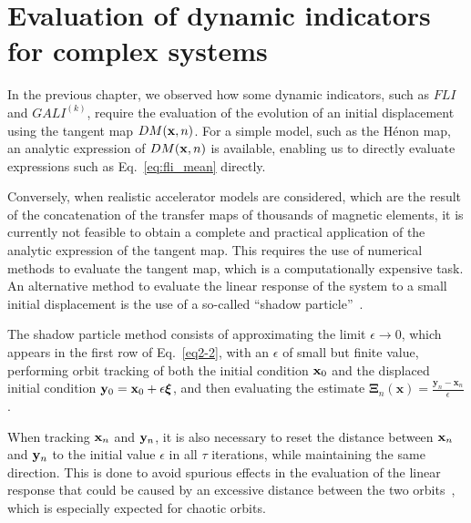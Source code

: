 \section{Evaluation of dynamic indicators for complex systems}\label{sec:8:evaluation}

In the previous chapter, we observed how some dynamic indicators, such as $FLI$ and $GALI^{(k)}$, require the evaluation of the evolution of an initial displacement using the tangent map $DM(\vb{x}, n)$. For a simple model, such as the Hénon map, an analytic expression of $DM(\vb{x}, n)$ is available, enabling us to directly evaluate expressions such as Eq.~\ref{eq:fli_mean} directly.

Conversely, when realistic accelerator models are considered, which are the result of the concatenation of the transfer maps of thousands of magnetic elements, it is currently not feasible to obtain a complete and practical application of the analytic expression of the tangent map. This requires the use of numerical methods to evaluate the tangent map, which is a computationally expensive task. An alternative method to evaluate the linear response of the system to a small initial displacement is the use of a so-called ``shadow particle''~\cite{Skokos2010b}.

The shadow particle method consists of approximating the limit $\epsilon\to 0$, which appears in the first row of Eq.~\eqref{eq2-2}, with an $\epsilon$ of small but finite value, performing orbit tracking of both the initial condition $\vb{x}_0$ and the displaced initial condition $\vb{y}_0 = \vb{x}_0 + \epsilon \boldsymbol{\xi}$, and then evaluating the estimate $\boldsymbol{\Xi}_{n}(\mathbf{x})=\frac{\mathbf{y}_{n}-\mathbf{x}_{n}}{\epsilon}$.

When tracking $\vb{x}_n$ and $\vb{y}_n$, it is also necessary to reset the distance between $\vb{x}_n$ and $\vb{y}_n$ to the initial value $\epsilon$ in all $\tau$ iterations, while maintaining the same direction. This is done to avoid spurious effects in the evaluation of the linear response that could be caused by an excessive distance between the two orbits~\cite{Skokos2010b}, which is especially expected for chaotic orbits.


